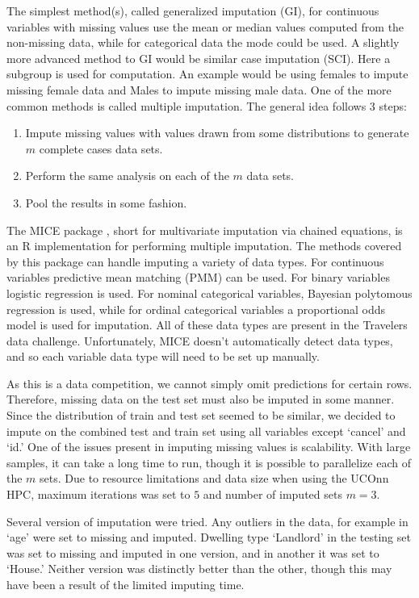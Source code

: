 \documentclass[11pt]{article}
\theoremstyle{remark}
\theoremstyle{definition}
\begin{document}
The simplest method(s), called generalized imputation (GI), for continuous variables with missing values use the mean or median values computed from the non-missing data, while for categorical data the mode could be used. A slightly more advanced method to GI would be similar case imputation (SCI). Here a subgroup is used for computation. An example would be using females to impute missing female data and Males to impute missing male data. One of the more common methods is called multiple imputation. The general idea follows 3 steps:
\begin{enumerate}[nolistsep]
	\item Impute missing values with values drawn from some distributions to generate $m$ complete cases data sets.
	\item Perform the same analysis on each of the $m$ data sets.
	\item Pool the results in some fashion.
\end{enumerate}
The MICE package \citep{buuren2010}, short for multivariate imputation via chained equations, is an R implementation for performing multiple imputation. The methods covered by this package can handle imputing a variety of data types. For continuous variables predictive mean matching (PMM) can be used. For binary variables logistic regression is used. For nominal categorical variables, Bayesian polytomous regression is used, while for ordinal categorical variables a proportional odds model is used for imputation. All of these data types are present in the Travelers data challenge. Unfortunately, MICE doesn't automatically detect data types, and so each variable data type will need to be set up manually. 

As this is a data competition, we cannot simply omit predictions for certain rows. Therefore, missing data on the test set must also be imputed in some manner. Since the distribution of train and test set seemed to be similar, we decided to impute on the combined test and train set using all variables except `cancel' and `id.' One of the issues present in imputing missing values is scalability. With large samples, it can take a long time to run, though it is possible to parallelize each of the $m$ sets. Due to resource limitations and data size when using the UCOnn HPC, maximum iterations was set to $5$ and number of imputed sets $m = 3$.

Several version of imputation were tried. Any outliers in the data, for example in `age' were set to missing and imputed. Dwelling type `Landlord' in the testing set was set to missing and imputed in one version, and in another it was set to `House.' Neither version was distinctly better than the other, though this may have been a result of the limited imputing time.
\end{document}
